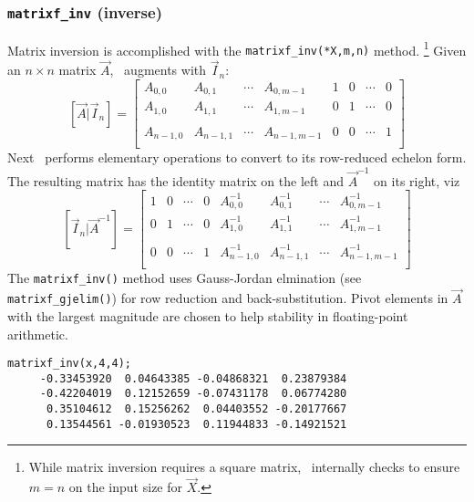 \subsubsection{{\tt matrixf\_inv} (inverse)}
\label{module:matrix:inv}
Matrix inversion is accomplished with the {\tt matrixf\_inv(*X,m,n)}
method.%
\footnote{While matrix inversion requires a square matrix, \liquid\
          internally checks to ensure $m=n$ on the input size for
          $\vec{X}$.}
Given an $n \times n$ matrix $\vec{A}$, \liquid\ augments with
$\vec{I}_n$:
\[
    \left[\vec{A}|\vec{I}_n\right] = 
    \left[
    \begin{array}{cccc|cccc}
    A_{0,0}     & A_{0,1}   & \cdots  & A_{0,m-1}   & 1 & 0 & \cdots & 0 \\
    A_{1,0}     & A_{1,1}   & \cdots  & A_{1,m-1}   & 0 & 1 & \cdots & 0 \\
                &           &         &             &   &   &        &   \\
    A_{n-1,0}   & A_{n-1,1} & \cdots  & A_{n-1,m-1} & 0 & 0 & \cdots & 1 \\
    \end{array}
    \right]
\]
Next \liquid\ performs elementary operations to convert to its
row-reduced echelon form.
The resulting matrix has the identity matrix on the left and
$\vec{A}^{-1}$ on its right, viz
\[
    \left[\vec{I}_n|\vec{A}^{-1}\right] = 
    \left[
    \begin{array}{cccc|cccc}
1 & 0 & \cdots & 0 & A^{-1}_{0,0}   & A^{-1}_{0,1}   & \cdots  & A^{-1}_{0,m-1}   \\
0 & 1 & \cdots & 0 & A^{-1}_{1,0}   & A^{-1}_{1,1}   & \cdots  & A^{-1}_{1,m-1}   \\
  &   &        &   &                &                &         &                  \\
0 & 0 & \cdots & 1 & A^{-1}_{n-1,0} & A^{-1}_{n-1,1} & \cdots  & A^{-1}_{n-1,m-1} \\
    \end{array}
    \right]
\]
The {\tt matrixf\_inv()} method uses Gauss-Jordan elmination
(see {\tt matrixf\_gjelim()}) for row reduction and back-substitution.
Pivot elements in $\vec{A}$ with the largest magnitude are chosen to
help stability in floating-point arithmetic.
%
\begin{Verbatim}[fontsize=\small]
    matrixf_inv(x,4,4);
     -0.33453920  0.04643385 -0.04868321  0.23879384
     -0.42204019  0.12152659 -0.07431178  0.06774280
      0.35104612  0.15256262  0.04403552 -0.20177667
      0.13544561 -0.01930523  0.11944833 -0.14921521
\end{Verbatim}


